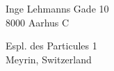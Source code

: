 \documentclass[10pt,a4paper]{altacv}
\begin{document}
\begin{minipage}[b]{0.5\textwidth}
{Inge Lehmanns Gade 10\\8000 Aarhus C}
\end{minipage}\hfill
\begin{minipage}[b]{0.5\textwidth}
{Espl. des Particules 1\\Meyrin, Switzerland}
\end{minipage}




































\begin{comment}
\cvsection{Completed Projects}

\cvevent{Project 1}{Funding agency/institution}{Project duration}{}
\begin{itemize}
\item Details
\end{itemize}

\divider

\cvevent{Project 2}{Funding agency/institution}{Project duration}{}
A short abstract would also work.

\medskip

\cvsection{A Day of My Life}

\wheelchart{1.5cm}{0.5cm}{%
  6/8em/accent!30/{Sleep,\\beautiful sleep}, 
  4/8em/accent!8/{Watching news},
  3/7em/accent!8/Meeting &Talking with friends,
  8/8em/accent!55/Day time Job,
  2/10em/accent!10/Sports and relaxation,
  5/6em/accent!20/Spending time with family
}
\end{comment}
\end{document}

